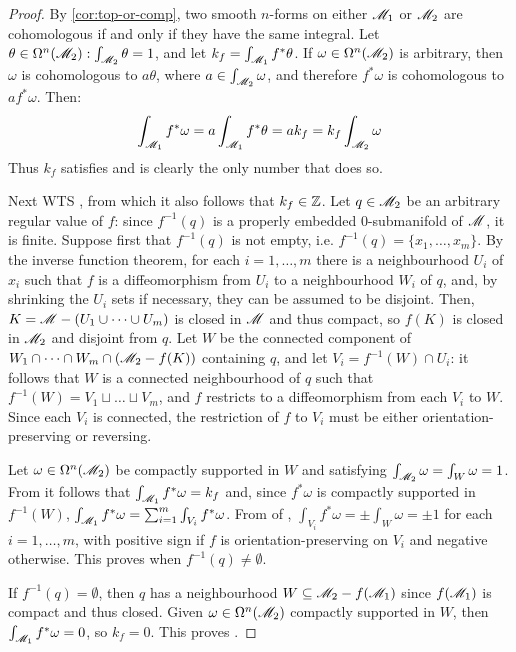 \begin{proofbox}
  \begin{proof}
    By \cref{cor:top-or-comp}, two smooth $ n $-forms on either $ \mathscr{M}_1 $ or $ \mathscr{M}_2 $ are cohomologous if and only if they have the same integral. Let $ \theta \in \Omega^{n}(\mathscr{M}_2) : \int_{\mathscr{M}_2} \theta = 1 $, and let $ k_f = \int_{\mathscr{M}_1} f^* \theta $. If $ \omega \in \Omega^{n}(\mathscr{M}_2) $ is arbitrary, then $ \omega $ is cohomologous to $ a \theta $, where $ a \in \int_{\mathscr{M}_2} \omega $, and therefore $ f^* \omega $ is cohomologous to $ a f^* \omega $. Then:
    \begin{equation*}
      \int_{\mathscr{M}_1} f^* \omega = a \int_{\mathscr{M}_1} f^* \theta = a k_f = k_f \int_{\mathscr{M}_2} \omega
    \end{equation*}
    Thus $ k_f $ satisfies  and is clearly the only number that does so.

    Next WTS , from which it also follows that $ k_f \in \mathbb{Z} $. Let $ q \in \mathscr{M}_2 $ be an arbitrary regular value of $ f $: since $ f^{-1}(q) $ is a properly embedded $ 0 $-submanifold of $ \mathscr{M} $, it is finite. Suppose first that $ f^{-1}(q) $ is not empty, i.e. $ f^{-1}(q) = \{x_1 , \dots , x_m\} $. By the inverse function theorem, for each $ i = 1 , \dots , m $ there is a neighbourhood $ U_i $ of $ x_i $ such that $ f $ is a diffeomorphism from $ U_i $ to a neighbourhood $ W_i $ of $ q $, and, by shrinking the $ U_i $ sets if necessary, they can be assumed to be disjoint. Then, $ K = \mathscr{M} - (U_1 \cup \dots \cup U_m) $ is closed in $ \mathscr{M} $ and thus compact, so $ f(K) $ is closed in $ \mathscr{M}_2 $ and disjoint from $ q $. Let $ W $ be the connected component of $ W_1 \cap \dots \cap W_m \cap (\mathscr{M}_2 - f(K)) $ containing $ q $, and let $ V_i = f^{-1}(W) \cap U_i $: it follows that $ W $ is a connected neighbourhood of $ q $ such that $ f^{-1}(W) = V_1 \sqcup \dots \sqcup V_m $, and $ f $ restricts to a diffeomorphism from each $ V_i $ to $ W $. Since each $ V_i $ is connected, the restriction of $ f $ to $ V_i $ must be either orientation-preserving or reversing.

    Let $ \omega \in \Omega^{n}(\mathscr{M}_2) $ be compactly supported in $ W $ and satisfying $ \int_{\mathscr{M}_2} \omega = \int_W \omega = 1 $. From  it follows that $ \int_{\mathscr{M}_1} f^* \omega = k_f $ and, since $ f^*\omega $ is compactly supported in $ f^{-1}(W) $, $ \int_{\mathscr{M}_1} f^* \omega = \sum_{i = 1}^m \int_{V_i} f^* \omega $. From  of , $ \int_{V_i} f^* \omega = \pm \int_W \omega = \pm 1 $ for each $ i = 1 , \dots , m $, with positive sign if $ f $ is orientation-preserving on $ V_i $ and negative otherwise. This proves  when $ f^{-1}(q) \neq \emptyset $.

    If $ f^{-1}(q) = \emptyset $, then $ q $ has a neighbourhood $ W \subseteq \mathscr{M}_2 - f(\mathscr{M}_1) $ since $ f(\mathscr{M}_1) $ is compact and thus closed. Given $ \omega \in \Omega^{n}(\mathscr{M}_2) $ compactly supported in $ W $, then $ \int_{\mathscr{M}_1} f^* \omega = 0 $, so $ k_f = 0 $. This proves .
  \end{proof}
\end{proofbox}

